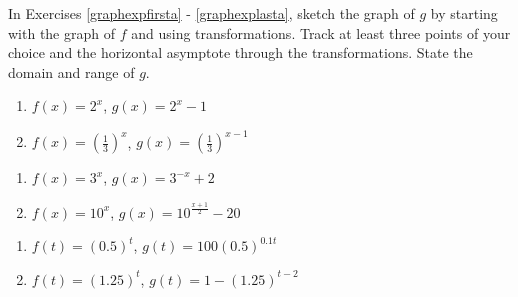 \documentclass{ximera}
\begin{document}
	\author{Stitz-Zeager}



\label{ExercisesforExponentialFunctions}



In Exercises \ref{graphexpfirsta} - \ref{graphexplasta}, sketch the graph of $g$ by starting with the graph of $f$ and using transformations.  Track at least three points of your choice and the horizontal asymptote through the transformations. State the domain and range of $g$.

\begin{multicols}{2}
\begin{enumerate}

\item  $f(x) = 2^{x}$, $g(x) = 2^{x} - 1$ \label{graphexpfirsta}

\item  $f(x) = \left(\frac{1}{3}\right)^{x}$, $g(x) = \left(\frac{1}{3}\right)^{x-1}$

\setcounter{HW}{\value{enumi}}
\end{enumerate}
\end{multicols}

\begin{multicols}{2}
\begin{enumerate}
\setcounter{enumi}{\value{HW}}

\item  $f(x) = 3^{x}$, $g(x) = 3^{-x}+2$

\item  $f(x) = 10^{x}$, $g(x) = 10^{\frac{x+1}{2}} - 20$  

\setcounter{HW}{\value{enumi}}
\end{enumerate}
\end{multicols}

\begin{multicols}{2}
\begin{enumerate}
\setcounter{enumi}{\value{HW}}

\item  $f(t) = (0.5)^{t}$, $g(t) = 100(0.5)^{0.1t}$

\item  $f(t) = (1.25)^{t}$, $g(t) = 1 - (1.25)^{t-2}$

\setcounter{HW}{\value{enumi}}
\end{enumerate}
\end{multicols}
\end{document}
